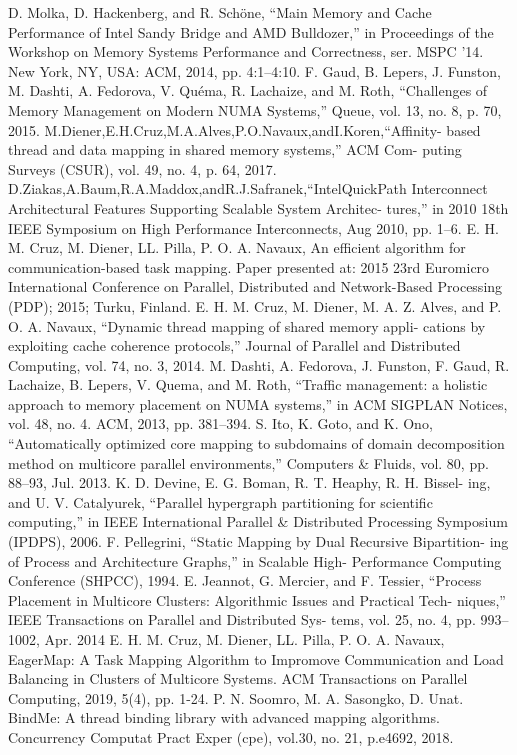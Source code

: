 \documentclass[a4paper,fleqn]{cas-sc}
\begin{document}
\begin{thebibliography}{70}

D. Molka, D. Hackenberg, and R. Schöne, “Main Memory and Cache Performance of Intel Sandy Bridge and AMD Bulldozer,” in Proceedings of the Workshop on Memory Systems Performance and Correctness, ser. MSPC ’14. New York, NY, USA: ACM, 2014, pp. 4:1–4:10.
F. Gaud, B. Lepers, J. Funston, M. Dashti, A. Fedorova, V. Quéma, R. Lachaize, and M. Roth, “Challenges of Memory Management on Modern NUMA Systems,” Queue, vol. 13, no. 8, p. 70, 2015.
M.Diener,E.H.Cruz,M.A.Alves,P.O.Navaux,andI.Koren,“Affinity- based thread and data mapping in shared memory systems,” ACM Com- puting Surveys (CSUR), vol. 49, no. 4, p. 64, 2017.
D.Ziakas,A.Baum,R.A.Maddox,andR.J.Safranek,“IntelQuickPath Interconnect Architectural Features Supporting Scalable System Architec- tures,” in 2010 18th IEEE Symposium on High Performance Interconnects, Aug 2010, pp. 1–6.
E. H. M. Cruz, M. Diener, LL. Pilla, P. O. A. Navaux, An efficient algorithm for communication-based task mapping. Paper presented at: 2015 23rd Euromicro International Conference on Parallel, Distributed and Network-Based Processing (PDP); 2015; Turku, Finland.
E. H. M. Cruz, M. Diener, M. A. Z. Alves, and P. O. A. Navaux, “Dynamic thread mapping of shared memory appli- cations by exploiting cache coherence protocols,” Journal of Parallel and Distributed Computing, vol. 74, no. 3, 2014.
M. Dashti, A. Fedorova, J. Funston, F. Gaud, R. Lachaize, B. Lepers, V. Quema, and M. Roth, “Traffic management: a holistic approach to memory placement on NUMA systems,” in ACM SIGPLAN Notices, vol. 48, no. 4. ACM, 2013, pp. 381–394.
S. Ito, K. Goto, and K. Ono, “Automatically optimized core mapping to subdomains of domain decomposition method on multicore parallel environments,” Computers & Fluids, vol. 80, pp. 88–93, Jul. 2013.
K. D. Devine, E. G. Boman, R. T. Heaphy, R. H. Bissel- ing, and U. V. Catalyurek, “Parallel hypergraph partitioning for scientific computing,” in IEEE International Parallel & Distributed Processing Symposium (IPDPS), 2006.
F. Pellegrini, “Static Mapping by Dual Recursive Bipartition- ing of Process and Architecture Graphs,” in Scalable High- Performance Computing Conference (SHPCC), 1994.
E. Jeannot, G. Mercier, and F. Tessier, “Process Placement in Multicore Clusters: Algorithmic Issues and Practical Tech- niques,” IEEE Transactions on Parallel and Distributed Sys- tems, vol. 25, no. 4, pp. 993–1002, Apr. 2014
E. H. M. Cruz, M. Diener, LL. Pilla, P. O. A. Navaux, EagerMap: A Task Mapping Algorithm to Impromove Communication and Load Balancing in Clusters of Multicore Systems. ACM Transactions on Parallel Computing, 2019, 5(4), pp. 1-24.
P. N. Soomro, M. A. Sasongko, D. Unat. BindMe: A thread binding library with advanced mapping algorithms. Concurrency Computat Pract Exper (cpe), vol.30, no. 21, p.e4692, 2018.


\end{thebibliography}
\end{document}
